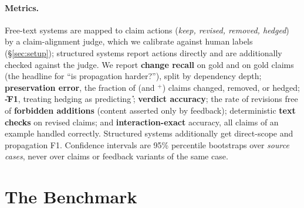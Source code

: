 \paragraph{Metrics.} Free-text systems are mapped to claim actions (\emph{keep, revised, removed, hedged}) by a claim-alignment judge, which we calibrate against human labels (\S\ref{sec:setup}); structured systems report actions directly and are additionally checked against the judge. We report \textbf{change recall} on gold \D{} and on gold \Pp{} claims (the headline for ``is propagation harder?''), split by dependency depth; \textbf{preservation error}, the fraction of \K{} (and \K$^{+}$) claims changed, removed, or hedged; \textbf{\U-F1}, treating hedging as predicting \U{}; \textbf{verdict accuracy}; the rate of revisions free of \textbf{forbidden additions} (content asserted only by feedback); deterministic \textbf{text checks} on revised claims; and \textbf{interaction-exact} accuracy, all claims of an example handled correctly. Structured systems additionally get direct-scope and propagation F1. Confidence intervals are 95\% percentile bootstraps over \emph{source cases}, never over claims or feedback variants of the same case.

\section{The \ms{} Benchmark}
\label{sec:data}
